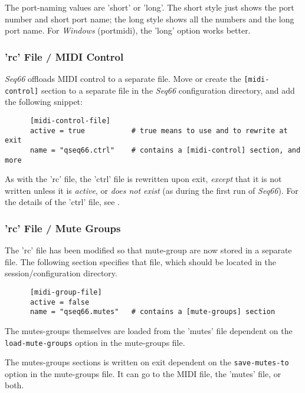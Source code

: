   The port-naming values are 'short' or 'long'.  The short style
  just shows the port number and short port name; the long style
  shows all the numbers and the long port name.
  For \textsl{Windows} (portmidi), the 'long' option works better.

\subsubsection{'rc' File / MIDI Control}
\label{subsubsec:configuration_rc_midi_control}

   \textsl{Seq66} offloads MIDI control to a separate file.
   Move or create
   the \texttt{[midi-control]} section to a separate file in
   the \textsl{Seq66} configuration directory, and add the following
   snippet:

   \begin{verbatim}
      [midi-control-file]
      active = true           # true means to use and to rewrite at exit
      name = "qseq66.ctrl"    # contains a [midi-control] section, and more
   \end{verbatim}

   As with the 'rc' file, the 'ctrl' file is rewritten upon exit,
   \textsl{except} that it is not written unless it is \textsl{active},
   or \textsl{does not exist} (as during the first run of \textsl{Seq66}).
   For the details of the 'ctrl' file, see
   .

\subsubsection{'rc' File / Mute Groups}
\label{subsubsec:configuration_rc_mute_groups}

   The 'rc' file has been modified so that mute-group are now stored in a
   separate file.  The following section specifies that file, which should be
   located in the session/configuration directory.

   \begin{verbatim}
      [midi-group-file]
      active = false
      name = "qseq66.mutes"   # contains a [mute-groups] section
   \end{verbatim}

   The mutes-groups themselves are loaded from the 'mutes' file dependent on
   the \texttt{load-mute-groups} option in the mute-groups file.

   The mutes-groups sections is written on exit dependent on the
   \texttt{save-mutes-to} option in the mute-groups file.
   It can go to the MIDI file, the 'mutes' file, or both.

